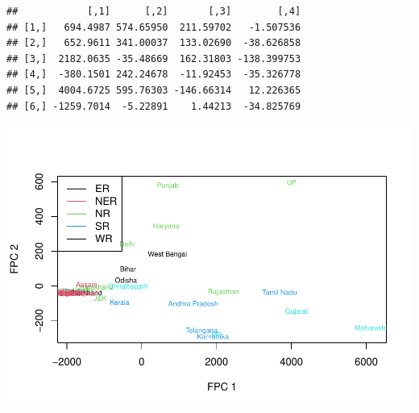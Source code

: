 \documentclass[
]{article}
\newenvironment{Shaded}{\begin{snugshade}}{\end{snugshade}}
\newcommand{\AttributeTok}[1]{\textcolor[rgb]{0.77,0.63,0.00}{#1}}
\newcommand{\DecValTok}[1]{\textcolor[rgb]{0.00,0.00,0.81}{#1}}
\newcommand{\FloatTok}[1]{\textcolor[rgb]{0.00,0.00,0.81}{#1}}
\newcommand{\FunctionTok}[1]{\textcolor[rgb]{0.00,0.00,0.00}{#1}}
\newcommand{\NormalTok}[1]{#1}
\newcommand{\OtherTok}[1]{\textcolor[rgb]{0.56,0.35,0.01}{#1}}
\newcommand{\SpecialCharTok}[1]{\textcolor[rgb]{0.00,0.00,0.00}{#1}}
\newcommand{\StringTok}[1]{\textcolor[rgb]{0.31,0.60,0.02}{#1}}
\begin{document}
\begin{verbatim}
##            [,1]      [,2]       [,3]        [,4]
## [1,]   694.4987 574.65950  211.59702   -1.507536
## [2,]   652.9611 341.00037  133.02690  -38.626858
## [3,]  2182.0635 -35.48669  162.31803 -138.399753
## [4,]  -380.1501 242.24678  -11.92453  -35.326778
## [5,]  4004.6725 595.76303 -146.66314   12.226365
## [6,] -1259.7014  -5.22891    1.44213  -34.825769
\end{verbatim}

\begin{Shaded}
\end{Shaded}

\includegraphics{Projet_CHESNAIS_GUIBERT_files/figure-latex/unnamed-chunk-47-1.pdf}
\end{document}
